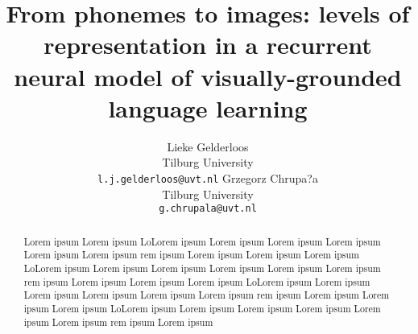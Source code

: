 \documentclass[11pt,letterpaper]{article}
\title{From phonemes to images: levels of representation in a
  recurrent neural model of visually-grounded language learning}
\author{Lieke Gelderloos \\
  Tilburg University \\
  {\tt l.j.gelderloos@uvt.nl} \And
  Grzegorz Chrupa?a \\
  Tilburg University \\
  {\tt g.chrupala@uvt.nl} }
\date{}
\begin{document}
\maketitle
\begin{abstract}
Lorem ipsum Lorem ipsum LoLorem ipsum Lorem ipsum Lorem ipsum Lorem
ipsum Lorem ipsum Lorem ipsum rem ipsum Lorem ipsum 
Lorem ipsum Lorem ipsum LoLorem ipsum Lorem ipsum Lorem ipsum Lorem
ipsum Lorem ipsum Lorem ipsum rem ipsum Lorem ipsum 
Lorem ipsum Lorem ipsum LoLorem ipsum Lorem ipsum Lorem ipsum Lorem
ipsum Lorem ipsum Lorem ipsum rem ipsum Lorem ipsum 
Lorem ipsum Lorem ipsum LoLorem ipsum Lorem ipsum Lorem ipsum Lorem
ipsum Lorem ipsum Lorem ipsum rem ipsum Lorem ipsum 

\end{abstract}











\end{document}

